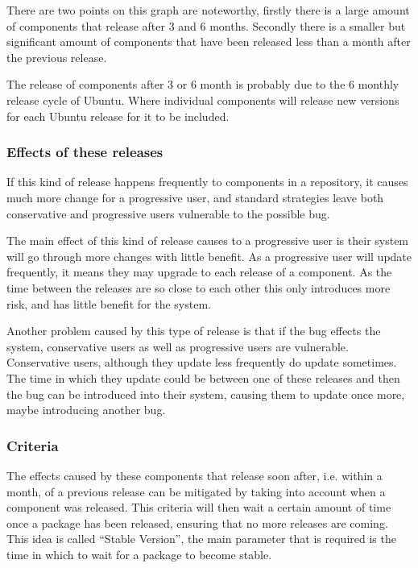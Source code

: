 There are two points on this graph are noteworthy, firstly there is a large amount of components that release after 3 and 6 months.
Secondly there is a smaller but significant amount of components that have been released less than a month after the previous release.

The release of components after 3 or 6 month is probably due to the 6 monthly release cycle of Ubuntu.
Where individual components will release new versions for each Ubuntu release for it to be included.

\subsubsection{Effects of these releases}
If this kind of release happens frequently to components in a repository, it causes much more change for a progressive user,
and standard strategies leave both conservative and progressive users vulnerable to the possible bug.

The main effect of this kind of release causes to a progressive user is their system will go through more changes with little benefit.
As a progressive user will update frequently, it means they may upgrade to each release of a component.
As the time between the releases are so close to each other this only introduces more risk, and has little benefit for the system.

Another problem caused by this type of release is that if the bug effects the system, conservative users as well as progressive users are vulnerable.
Conservative users, although they update less frequently do update sometimes.
The time in which they update could be between one of these releases and then the bug can be introduced into their system, 
causing them to update once more, maybe introducing another bug.


\subsubsection{Criteria}   
The effects caused by these components that release soon after, i.e. within a month, of a previous release can be mitigated by taking into account when a component was released.
This criteria will then wait a certain amount of time once a package has been released, ensuring that no more releases are coming.
This idea is called ``Stable Version'', the main parameter that is required is the time in which to wait for a package to become stable.

